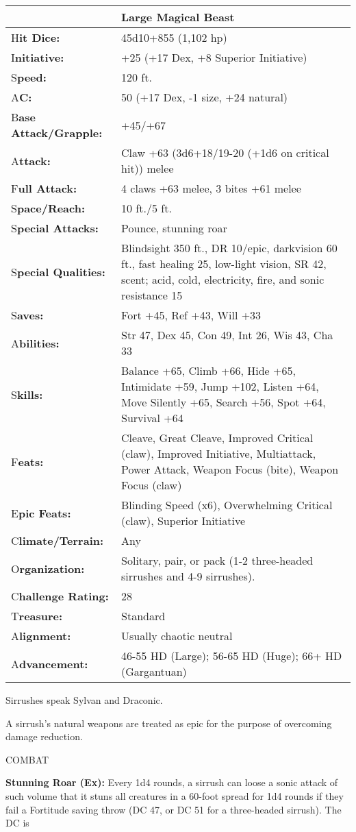 \documentclass{article}
\begin{document}
{\begin{tabular}{|>{\raggedright}p{66pt}|>{\raggedright}p{259pt}|}
\hline
  & Large Magical Beast \tabularnewline
\hline
H\textbf{it Dice:} & 45d10+855 (1,102 hp) \tabularnewline
\hline
I\textbf{nitiative:} & +25 (+17 Dex, +8 Superior Initiative) \tabularnewline
\hline
S\textbf{peed:} & 120 ft. \tabularnewline
\hline
A\textbf{C:} & 50 (+17 Dex, -1 size, +24 natural) \tabularnewline
\hline
B\textbf{ase Attack/Grapple:} & +45/+67\tabularnewline
\hline
A\textbf{ttack:} & Claw +63 (3d6+18/19-20 (+1d6 on critical hit)) melee\tabularnewline
\hline
F\textbf{ull Attack:} & 4 claws +63 melee, 3 bites +61 melee\tabularnewline
\hline
S\textbf{pace/Reach:} & 10 ft./5 ft. \tabularnewline
\hline
S\textbf{pecial Attacks:} & Pounce, stunning roar \tabularnewline
\hline
S\textbf{pecial Qualities:} & Blindsight 350 ft., DR 10/epic, darkvision 60 ft., 
fast healing 25, low-light vision, SR 42, scent; acid, cold, electricity, fire, 
and sonic resistance 15 \tabularnewline
\hline
S\textbf{aves:} & Fort +45, Ref +43, Will +33 \tabularnewline
\hline
A\textbf{bilities:} & Str 47, Dex 45, Con 49, Int 26, Wis 43, Cha 33 \tabularnewline
\hline
S\textbf{kills:} & Balance +65, Climb +66, Hide +65, Intimidate +59, Jump +102, 
Listen +64, Move Silently +65, Search +56, Spot +64, Survival +64\tabularnewline
\hline
F\textbf{eats:} & Cleave, Great Cleave, Improved Critical (claw), Improved Initiative, 
Multiattack, Power Attack, Weapon Focus (bite), Weapon Focus (claw) \tabularnewline
\hline
E\textbf{pic Feats:} & Blinding Speed (x6), Overwhelming Critical (claw), Superior 
Initiative \tabularnewline
\hline
C\textbf{limate/Terrain:} & Any \tabularnewline
\hline
O\textbf{rganization:} & Solitary, pair, or pack (1-2 three-headed sirrushes and 
4-9 sirrushes). \tabularnewline
\hline
C\textbf{hallenge Rating:} & 28 \tabularnewline
\hline
T\textbf{reasure:} & Standard \tabularnewline
\hline
A\textbf{lignment:} & Usually chaotic neutral \tabularnewline
\hline
A\textbf{dvancement:} & 46-55 HD (Large); 56-65 HD (Huge); 66+ HD (Gargantuan) 
\tabularnewline
\hline
\end{tabular}

Sirrushes speak Sylvan and Draconic. 

A sirrush's natural weapons are treated as epic for the purpose of overcoming damage 
reduction.

COMBAT 

\textbf{Stunning Roar (Ex):} Every 1d4 rounds, a sirrush can loose a sonic attack 
of such volume that it stuns all creatures in a 60-foot spread for 1d4 rounds if 
they fail a Fortitude saving throw (DC 47, or DC 51 for a three-headed sirrush). 
The DC is 

}
\end{document}
